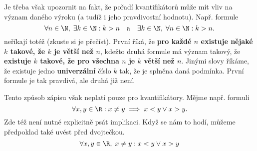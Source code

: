 Je třeba však upozornit na fakt, že pořadí kvantifikátorů může mít vliv na význam daného výroku (a tudíž i jeho pravdivostní hodnotu). Např. formule
\begin{equation*}
    \forall n\in\N,\; \exists k\in\N : k > n\quad\text{a}\quad\exists k\in\N,\;\forall n\in\N : k > n.
\end{equation*}
neříkají totéž (zkuste si je přečíst). První říká, že \textbf{pro každé $n$ existuje nějaké $k$ takové, že $k$ je větší než $n$}, kdežto druhá formule má význam takový, že \textbf{existuje $k$ takové, že pro všechna $n$ je $k$ větší než $n$}. Jinými slovy říkáme, že existuje jedno \textbf{univerzální} číslo $k$ tak, že je splněna daná podmínka. První formule je tak pravdivá, ale druhá již není.\par
Tento způsob zápisu však neplatí pouze pro kvantifikátory. Mějme např. formuli
\begin{equation*}
    \forall x,y\in\R: x\neq y \implies x < y \lor x > y.
\end{equation*}
Zde též není nutné explicitně psát implikaci. Když se nám to hodí, můžeme předpoklad také uvést před dvojtečkou.
\begin{equation*}
    \forall x,y\in\R,\;x\neq y: x < y \lor x > y
\end{equation*}

